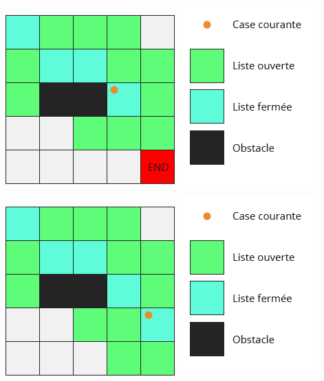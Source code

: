 \documentclass[11pt]{beamer}
\begin{document}
		\begin{frame}
			\begin{center}
				\includegraphics[scale=0.5]{images/Algo_6.png}
				\hspace{1cm}
				\includegraphics[scale=0.5]{images/Legend.png}
			\end{center}
		\end{frame}
		\begin{frame}
			\begin{center}
				\includegraphics[scale=0.5]{images/Algo_7.png}
				\hspace{1cm}
				\includegraphics[scale=0.5]{images/Legend.png}
			\end{center}
		\end{frame}
\end{document}
